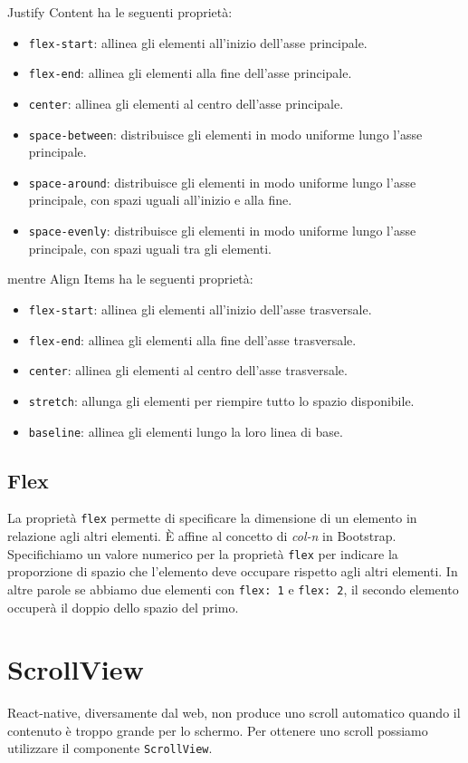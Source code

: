 \documentclass[12pt]{article}
\begin{document}
Justify Content ha le seguenti proprietà:
\begin{itemize}
\item \texttt{flex-start}: allinea gli elementi all'inizio dell'asse principale.
\item \texttt{flex-end}: allinea gli elementi alla fine dell'asse principale.
\item \texttt{center}: allinea gli elementi al centro dell'asse principale.
\item \texttt{space-between}: distribuisce gli elementi in modo uniforme lungo l'asse principale.
\item \texttt{space-around}: distribuisce gli elementi in modo uniforme lungo l'asse principale, 
con spazi uguali all'inizio e alla fine.
\item \texttt{space-evenly}: distribuisce gli elementi in modo uniforme lungo l'asse principale, 
con spazi uguali tra gli elementi.
\end{itemize}

mentre Align Items ha le seguenti proprietà:
\begin{itemize}
\item \texttt{flex-start}: allinea gli elementi all'inizio dell'asse trasversale.
\item \texttt{flex-end}: allinea gli elementi alla fine dell'asse trasversale.
\item \texttt{center}: allinea gli elementi al centro dell'asse trasversale.
\item \texttt{stretch}: allunga gli elementi per riempire tutto lo spazio disponibile.
\item \texttt{baseline}: allinea gli elementi lungo la loro linea di base.
\end{itemize}

\subsection{Flex}
La proprietà \texttt{flex} permette di specificare la dimensione di un elemento in relazione
agli altri elementi. È affine al concetto di \textit{col-n} in Bootstrap.
Specifichiamo un valore numerico per la proprietà \texttt{flex} per indicare la proporzione
di spazio che l'elemento deve occupare rispetto agli altri elementi.
In altre parole se abbiamo due elementi con \texttt{flex: 1} e \texttt{flex: 2}, il secondo
elemento occuperà il doppio dello spazio del primo.


\section{ScrollView}
React-native, diversamente dal web, non produce uno scroll automatico
quando il contenuto è troppo grande per lo schermo. Per ottenere uno scroll
possiamo utilizzare il componente \texttt{ScrollView}. 
\end{document}
